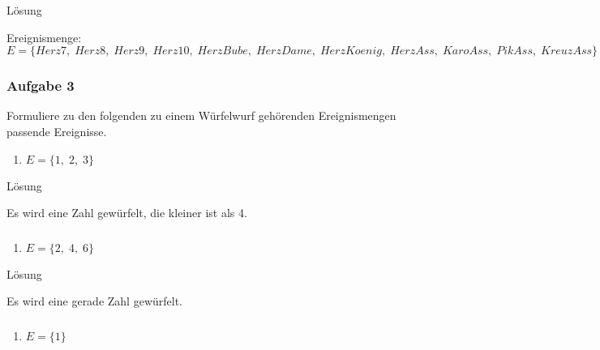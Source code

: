\documentclass[
  ngerman,
]{book}
\providecommand{\tightlist}{%
  \setlength{\itemsep}{0pt}\setlength{\parskip}{0pt}}
\begin{document}
Lösung

Ereignismenge: \(E=\{Herz7,\;Herz8,\;Herz9,\;Herz10,\;HerzBube,\;HerzDame,\;HerzKoenig,\;HerzAss,\;KaroAss,\;PikAss,\;KreuzAss\}\)

\hypertarget{section-59}{%
\subsubsection*{}\label{section-59}}

\hypertarget{aufgabe-3-2}{%
\subsubsection*{Aufgabe 3}\label{aufgabe-3-2}}

Formuliere zu den folgenden zu einem Würfelwurf gehörenden Ereignismengen passende Ereignisse.

\begin{enumerate}
\def\labelenumi{\alph{enumi})}
\tightlist
\item
  \(E=\{1,\;2,\;3\}\)
\end{enumerate}

Lösung

Es wird eine Zahl gewürfelt, die kleiner ist als 4.

\hypertarget{section-60}{%
\subsubsection*{}\label{section-60}}

\begin{enumerate}
\def\labelenumi{\alph{enumi})}
\setcounter{enumi}{1}
\tightlist
\item
  \(E=\{2,\;4,\;6\}\)
\end{enumerate}

Lösung

Es wird eine gerade Zahl gewürfelt.

\hypertarget{section-61}{%
\subsubsection*{}\label{section-61}}

\begin{enumerate}
\def\labelenumi{\alph{enumi})}
\setcounter{enumi}{2}
\tightlist
\item
  \(E=\{1\}\)
\end{enumerate}
\end{document}
